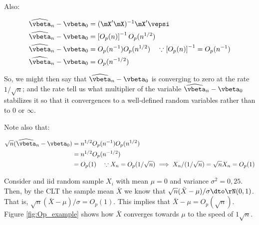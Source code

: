 \documentclass[english,12pt]{book}\usepackage[]{graphicx}\usepackage[]{xcolor}
\begin{document}
\begin{example}
Also:

\begin{equation*}
  \begin{aligned}
\widehat{\vbeta}_n - \vbeta_0 & =  (\mX'\mX)^{-1}\mX'\vepsi  \\
\widehat{\vbeta}_n - \vbeta_0 & =  \left[O_p(n)\right]^{-1}O_p(n^{1/2}) \\
\widehat{\vbeta}_n - \vbeta_0 & =  O_p(n^{-1})O_p(n^{1/2}) \quad \because \left[O_p(n)\right]^{-1}= O_p(n^{-1})\\
\widehat{\vbeta}_n - \vbeta_0 & =  O_p(n^{-1/2})\\
\end{aligned}
\end{equation*}
%

So, we might then say that $\widehat{\vbeta}_n - \vbeta_0$ is converging to zero at the rate $1/\sqrt{n}$; and the rate tell us what multiplier of the variable $\widehat{\vbeta}_n - \vbeta_0$ stabilizes it so that it convergences to a well-defined random variables rather than to 0 or $\infty$.

Note also that:

\begin{equation*}
  \begin{aligned}
    \sqrt{n}(\widehat{\vbeta}_n - \vbeta_0) & =  n^{1/2}O_p(n^{-1})O_p(n^{1/2})\\
    & = n^{1/2} O_p(n^{-1/2}) \\
    & = O_p(1) \quad \because X_n = O_p(1/\sqrt{n}) \implies X_n / (1/\sqrt{n})= \sqrt{n} X_n = O_p(1)
  \end{aligned}
\end{equation*}
\end{example}

\begin{example}
Consider and iid random sample $X_i$ with mean $\mu = 0$ and variance $\sigma^2 = 0,25$. Then, by the CLT the sample mean $\bar{X}$ we know that $\sqrt{n}(\bar{X}-\mu) /\sigma \dto \rN(0 , 1)$. That is, $\sqrt{n}(\bar{X}-\mu)/\sigma = O_p(1)$. This implies that $\bar{X} - \mu= O_p(\sqrt{n})$. Figure \ref{fig:Op_example} shows how $\bar{X}$ converges towards $\mu$ to the speed of $1\sqrt{n}$.
\end{example}
\end{document}
